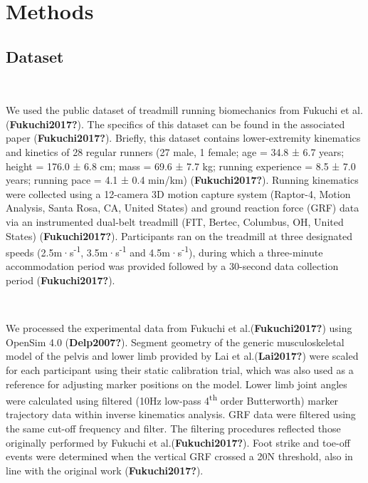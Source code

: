 \documentclass[]{elsarticle} %
\begin{document}
\hypertarget{methods}{%
\section{Methods}\label{methods}}

\hypertarget{dataset}{%
\subsection{Dataset}\label{dataset}}

~

We used the public dataset of treadmill running biomechanics from
Fukuchi et al.(\textbf{Fukuchi2017?}). The specifics of this dataset can
be found in the associated paper (\textbf{Fukuchi2017?}). Briefly, this
dataset contains lower-extremity kinematics and kinetics of 28 regular
runners (27 male, 1 female; age = 34.8 ± 6.7 years; height = 176.0 ± 6.8
cm; mass = 69.6 ± 7.7 kg; running experience = 8.5 ± 7.0 years; running
pace = 4.1 ± 0.4 min/km) (\textbf{Fukuchi2017?}). Running kinematics
were collected using a 12-camera 3D motion capture system (Raptor-4,
Motion Analysis, Santa Rosa, CA, United States) and ground reaction
force (GRF) data via an instrumented dual-belt treadmill (FIT, Bertec,
Columbus, OH, United States) (\textbf{Fukuchi2017?}). Participants ran
on the treadmill at three designated speeds (2.5m·s\textsuperscript{-1},
3.5m·s\textsuperscript{-1} and 4.5m·s\textsuperscript{-1}), during which
a three-minute accommodation period was provided followed by a 30-second
data collection period (\textbf{Fukuchi2017?}).

~

We processed the experimental data from Fukuchi et
al.(\textbf{Fukuchi2017?}) using OpenSim 4.0 (\textbf{Delp2007?}).
Segment geometry of the generic musculoskeletal model of the pelvis and
lower limb provided by Lai et al.(\textbf{Lai2017?}) were scaled for
each participant using their static calibration trial, which was also
used as a reference for adjusting marker positions on the model. Lower
limb joint angles were calculated using filtered (10Hz low-pass
4\textsuperscript{th} order Butterworth) marker trajectory data within
inverse kinematics analysis. GRF data were filtered using the same
cut-off frequency and filter. The filtering procedures reflected those
originally performed by Fukuchi et al.(\textbf{Fukuchi2017?}). Foot
strike and toe-off events were determined when the vertical GRF crossed
a 20N threshold, also in line with the original work
(\textbf{Fukuchi2017?}).
\end{document}
